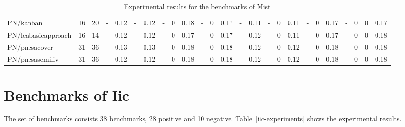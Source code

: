 \documentclass{article}
\newcommand{\mist}{{\sc Mist}}
\newcommand{\iic}{{\sc Iic}}
\begin{document}
\begin{table}[h]
\begin{center}
\begin{tabular}{ | l | r | r | *{22}{ r | } }
    \hline
PN/kanban & 16 & 20 & - & 0.12 & - & 0.12 & - & 0 & 0.18 & - & 0 & 0.17 & - & 0.11 & - & 0 & 0.11 & - & 0 & 0.17 & - & 0 & 0 & 0.17 \\
PN/leabasicapproach & 16 & 14 & - & 0.12 & - & 0.12 & - & 0 & 0.17 & - & 0 & 0.17 & - & 0.12 & - & 0 & 0.11 & - & 0 & 0.17 & - & 0 & 0 & 0.18 \\
PN/pncsacover & 31 & 36 & - & 0.13 & - & 0.13 & - & 0 & 0.18 & - & 0 & 0.18 & - & 0.12 & - & 0 & 0.12 & - & 0 & 0.18 & - & 0 & 0 & 0.18 \\
PN/pncsasemiliv & 31 & 36 & - & 0.12 & - & 0.12 & - & 0 & 0.18 & - & 0 & 0.18 & - & 0.12 & - & 0 & 0.12 & - & 0 & 0.18 & - & 0 & 0 & 0.18 \\
    \hline
  \end{tabular}
\end{center}
\caption{Experimental results for the benchmarks of \mist}
\label{mist-experiments}
\end{table}

\section{Benchmarks of \iic}

The set of benchmarks consists 38 benchmarks, 28 positive and 10 negative.
Table~\ref{iic-experiments} shows the experimental results.

\iffalse
TODO: Use fixed or non-fixed benchmark?  Source for list of positives and negatives?
\fi
\end{document}
